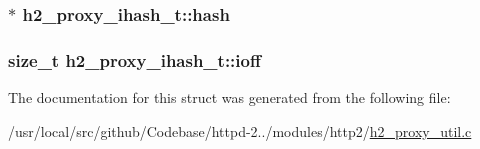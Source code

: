 \subsubsection[{\texorpdfstring{hash}{hash}}]{$\ast$ h2\+\_\+proxy\+\_\+ihash\+\_\+t\+::hash}\hypertarget{structh2__proxy__ihash__t_a571cfbedb6d68c96706cb214dac890d8}{}\label{structh2__proxy__ihash__t_a571cfbedb6d68c96706cb214dac890d8}
\subsubsection[{\texorpdfstring{ioff}{ioff}}]{\setlength{\rightskip}{0pt plus 5cm}size\+\_\+t h2\+\_\+proxy\+\_\+ihash\+\_\+t\+::ioff}\hypertarget{structh2__proxy__ihash__t_ad9d19db6645a3ae8280a09c68ae26ce2}{}\label{structh2__proxy__ihash__t_ad9d19db6645a3ae8280a09c68ae26ce2}


The documentation for this struct was generated from the following file\+:\begin{DoxyCompactItemize}
\item 
/usr/local/src/github/\+Codebase/httpd-\/2../modules/http2/\hyperlink{h2__proxy__util_8c}{h2\+\_\+proxy\+\_\+util.\+c}\end{DoxyCompactItemize}

